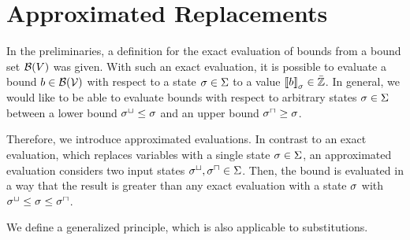 \chapter{Approximated Replacements}

In the preliminaries, a definition for the exact evaluation of bounds from a bound set $\mathcal{B}(V)$ was given.
With such an exact evaluation, it is possible to evaluate a bound $b \in \mathcal{B}(\mathcal{V})$ with respect to a state $\sigma \in \Sigma$ to a value $\left\llbracket b \right\rrbracket_{\sigma} \in \bar{\mathbb{Z}}$.
In general, we would like to be able to evaluate bounds with respect to arbitrary states $\sigma \in \Sigma$ between a lower bound ${\sigma^\sqcup} \leq \sigma$ and an upper bound ${\sigma^\sqcap} \geq \sigma$.

Therefore, we introduce approximated evaluations.
In contrast to an exact evaluation, which replaces variables with a single state $\sigma \in \Sigma$, an approximated evaluation considers two input states ${\sigma^\sqcup}, {\sigma^\sqcap} \in \Sigma$.
Then, the bound is evaluated in a way that the result is greater than any exact evaluation with a state $\sigma$ with ${\sigma^\sqcup} \leq \sigma \leq {\sigma^\sqcap}$.

We define a generalized principle, which is also applicable to substitutions.

